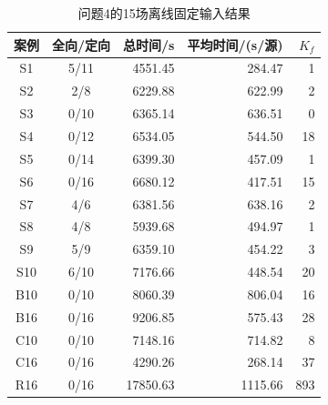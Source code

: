 \begin{table}[H]\centering\caption{问题4的15场离线固定输入结果}\label{tab:q4}
\small\setlength{\tabcolsep}{7pt}
\begin{tabular}{ccrrr}\toprule
案例 & 全向/定向 & 总时间/s & 平均时间/(s/源) & $K_f$\\\midrule
S1 & 5/11 & 4551.45 & 284.47 & 1\\
S2 & 2/8 & 6229.88 & 622.99 & 2\\
S3 & 0/10 & 6365.14 & 636.51 & 0\\
S4 & 0/12 & 6534.05 & 544.50 & 18\\
S5 & 0/14 & 6399.30 & 457.09 & 1\\
S6 & 0/16 & 6680.12 & 417.51 & 15\\
S7 & 4/6 & 6381.56 & 638.16 & 2\\
S8 & 4/8 & 5939.68 & 494.97 & 1\\
S9 & 5/9 & 6359.10 & 454.22 & 3\\
S10 & 6/10 & 7176.66 & 448.54 & 20\\
B10 & 0/10 & 8060.39 & 806.04 & 16\\
B16 & 0/16 & 9206.85 & 575.43 & 28\\
C10 & 0/10 & 7148.16 & 714.82 & 8\\
C16 & 0/16 & 4290.26 & 268.14 & 37\\
R16 & 0/16 & 17850.63 & 1115.66 & 893\\
\bottomrule\end{tabular}
\end{table}
